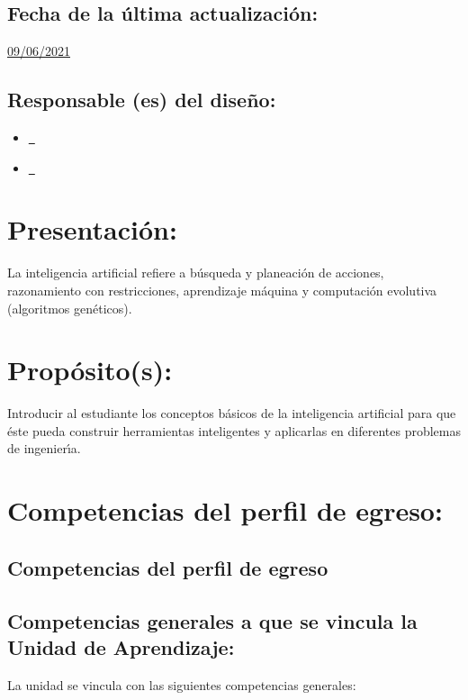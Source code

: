 \documentclass[10 pt]{article}
\begin{document}
\subsection{Fecha de la \'{u}ltima actualizaci\'{o}n:} \underline{09/06/2021}
\subsection{Responsable (es) del dise\~{n}o:}
\begin{itemize}[label={}]
\item \underline{\nromeo~\romeo}
\item \underline{\nelisa~\elisa}
\end{itemize}
\newpage
\section{Presentaci\'{o}n:}

La inteligencia artificial refiere a b\'{u}squeda y planeaci\'{o}n de
acciones, razonamiento con restricciones, aprendizaje m\'{a}quina y
computaci\'{o}n evolutiva (algoritmos gen\'{e}ticos).

\section{Prop\'{o}sito(s):}

Introducir al estudiante los conceptos b\'{a}sicos de la inteligencia
artificial para que \'{e}ste pueda construir herramientas inteligentes
y aplicarlas en diferentes problemas de ingenier\'{\i}a.

\section{Competencias del perfil de egreso:}
\subsection{Competencias del perfil de egreso}




  
\subsection{Competencias generales a que se vincula la Unidad de
    Aprendizaje:}

  La unidad se vincula con las siguientes competencias generales:
\end{document}
